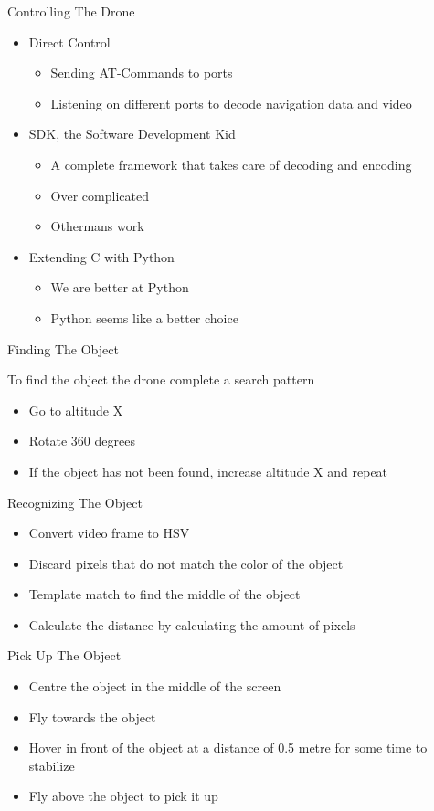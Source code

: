 \documentclass{beamer}
\newcommand{\slide}[2]
{
\begin{frame}
\begin{block}{#1} 

#2

\end{block} \end{frame}
}
\begin{document}
\slide{Controlling The Drone}{
\begin{itemize}
    \item Direct Control
        \begin{itemize}
            \item Sending AT-Commands to ports
            \item Listening on different ports to decode navigation data and video
        \end{itemize}
    \item SDK, the Software Development Kid
        \begin{itemize}
            \item A complete framework that takes care of decoding and encoding
            \item Over complicated
            \item Othermans work
        \end{itemize}
    \item Extending C with Python
        \begin{itemize}
            \item We are better at Python
            \item Python seems like a better choice
        \end{itemize}
\end{itemize}
}

\slide{Finding The Object}{
To find the object the drone complete a search pattern
\begin{itemize}
    \item Go to altitude X
    \item Rotate 360 degrees
    \item If the object has not been found, increase altitude X and repeat
\end{itemize}
}

\slide{Recognizing The Object}{
\begin{itemize}
    \item Convert video frame to HSV
    \item Discard pixels that do not match the color of the object
    \item Template match to find the middle of the object
    \item Calculate the distance by calculating the amount of pixels
\end{itemize}
}

\slide{Pick Up The Object}{
\begin{itemize}
    \item Centre the object in the middle of the screen
    \item Fly towards the object
    \item Hover in front of the object at a distance of 0.5 metre for some time to stabilize
    \item Fly above the object to pick it up
\end{itemize}
}
\end{document}
